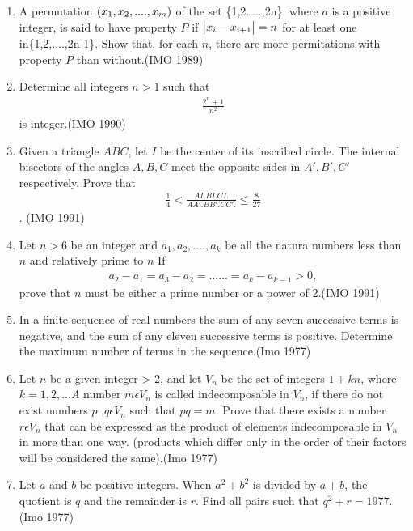 \begin{enumerate}
	\item A permutation $\left(x_1,x_2,....,x_m\right)$ of the set \{1,2.....,2n\}. where $a$ is a positive integer, is said to have property $P$ if $\begin{vmatrix}x_i - x_{i+1}\end{vmatrix} = n $ for at least one in\{1,2,....,2n-1\}. Show that, for each $n$, there are more permitations with property $P$ than without.\hfill(IMO 1989)

	\item Determine all integers $n>1$  such that
		\begin{align*} \frac{{2^n}+1}{n^2}\end{align*}is integer.\hfill(IMO 1990)


 \item Given a triangle $ABC$, let $I$ be the center of its inscribed circle. The internal bisectors of the angles $A, B, C$ meet the opposite sides in $A', B', C'$ respectively. Prove that
	 \begin{align*}\frac{1}{4} < \frac{AI. BI. CI.}{AA'. BB'. CC'.}\leq\frac{8}{27}\end{align*}. \hfill(IMO 1991)


\item Let $n > 6$ be an integer and $a_1, a_2,....,a_k $ be all the natura numbers less than $n$ and relatively prime to $n$ If \begin{align*}
a_2-a_1=a_3-a_2=......=a_k-a_{k-1} > 0,\end{align*}
       prove that $n$ must be either a prime number or a power of 2.\hfill(IMO 1991)
       \item In a finite sequence of real numbers the sum of any seven successive terms is negative, and the sum of any eleven successive terms is positive. Determine the maximum number of terms in the sequence.\hfill(Imo 1977)

\item 	Let $n$ be a given integer > $2$, and let $V_{n}$ be the set of integers $1+ kn$, where $k = 1, 2 ,\ldots A$ number $m \epsilon V_{n}$ is called indecomposable in $V_{n}$, if there do not exist numbers $p$ ,$q \epsilon V_{n}$ such that $pq = m$. Prove that there exists a number $r \epsilon V_{n}$ that can be expressed as the product of elements indecomposable in $V_{n}$ in more than one way. (products which differ only in the order of their factors will be considered the same).\hfill(Imo 1977)

\item Let $a$ and $b$ be positive integers. When $a^2 + b^2$ is divided by $a+b$, the quotient is $q$ and the remainder is $r$. Find all pairs  such that $q^2 + r = 1977.$ \hfill(Imo 1977)


\end{enumerate}
